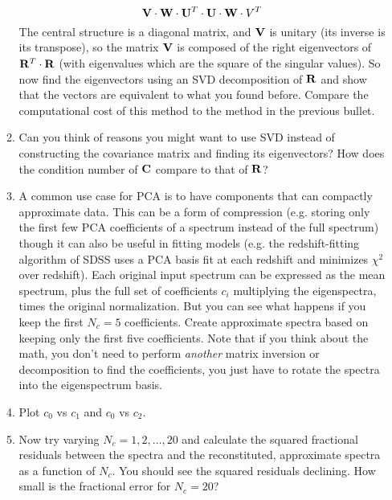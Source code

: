 \documentclass[11pt, preprint]{aastex}
\begin{document}
\begin{enumerate}
\begin{enumerate}
\begin{equation}
         {\bf V}\cdot{\bf W}\cdot{\bf U}^T\cdot{\bf U}\cdot{\bf W}\cdot{V}^T
       \end{equation}
       The central structure is a diagonal matrix, and ${\bf V}$ is
       unitary (its inverse is its transpose), so the matrix ${\bf V}$
       is composed of the right eigenvectors of
       ${\bf R}^T\cdot{\bf R}$ (with eigenvalues which are the square
       of the singular values). So now find the eigenvectors using an
       SVD decomposition of ${\bf R}$ and show that the vectors are
       equivalent to what you found before. Compare the computational
       cost of this method to the method in the previous bullet.
    \item Can you think of reasons you might want to use SVD instead
      of constructing the covariance matrix and finding its
      eigenvectors? How does the condition number of ${\bf C}$ compare
      to that of ${\bf R}$?
     \item A common use case for PCA is to have components that can
       compactly approximate data. This can be a form of compression
       (e.g. storing only the first few PCA coefficients of a spectrum
       instead of the full spectrum) though it can also be useful in
       fitting models (e.g. the redshift-fitting algorithm of SDSS
       uses a PCA basis fit at each redshift and minimizes $\chi^2$
       over redshift). Each original input spectrum can be expressed
       as the mean spectrum, plus the full set of coefficients $c_i$
       multiplying the eigenspectra, times the original
       normalization. But you can see what happens if you keep the
       first $N_c=5$ coefficients. Create approximate spectra based on
       keeping only the first five coefficients. Note that if you
       think about the math, you don't need to perform {\it another}
       matrix inversion or decomposition to find the coefficients, you
       just have to rotate the spectra into the eigenspectrum basis.
     \item Plot $c_0$ vs $c_1$ and $c_0$ vs $c_2$.
     \item Now try varying $N_c =1,2,\ldots, 20$ and calculate the
       squared fractional residuals between the spectra and the
       reconstituted, approximate spectra as a function of $N_c$. You
       should see the squared residuals declining. How small is the
       fractional error for $N_c =20$?
  \end{enumerate}
\end{enumerate}
\end{document}
